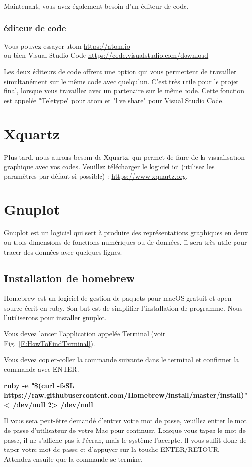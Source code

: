 \documentclass{article}
\newcommand\fig[1]{{Fig.~\ref{#1}}}
\begin{document}
Maintenant, vous avez également besoin d'un éditeur de code.
\subsubsection{éditeur de code}
Vous pouvez essayer atom \href{https://atom.io}{https://atom.io}\\
ou bien Visual Studio Code \href{https://code.visualstudio.com/download}{https://code.visualstudio.com/download}

Les deux éditeurs de code offrent une option qui vous permettent de travailler simultanément sur le même code avec quelqu'un. C'est très utile pour le projet final, lorsque vous travaillez avec un partenaire sur le même code. Cette fonction est appelée "Teletype" pour atom et "live share" pour Visual Studio Code. 

\section{Xquartz}
Plus tard, nous aurons besoin de Xquartz, qui permet de faire de la visualisation graphique avec vos codes.
Veuillez télécharger le logiciel ici (utilisez les paramètres par défaut si possible) : \href{https://www.xquartz.org}{https://www.xquartz.org}.
\section{Gnuplot}
Gnuplot est un logiciel qui sert à produire des représentations graphiques en deux ou trois dimensions de fonctions numériques ou de données. Il sera très utile pour tracer des données avec quelques lignes.
\subsection{Installation de homebrew}
Homebrew est un logiciel de gestion de paquets pour macOS gratuit et open-source écrit en ruby. Son but est de simplifier l'installation de programme. Nous l'utiliserons pour installer gnuplot.

Vous devez lancer l'application appelée Terminal (voir \fig{F:HowToFindTerminal}).

Vous devez copier-coller la commande suivante dans le terminal et confirmer la commande avec ENTER.
\begin{tcolorbox}[width=\textwidth,colframe=Bittersweet,colback={black},title={Ceci est le terminal},outer arc=0mm,colupper=white]    
      \large\textbf{ruby -e "\$(curl -fsSL https://raw.githubusercontent.com/Homebrew/install/master/install)" < /dev/null 2> /dev/null}
\end{tcolorbox}
Il vous sera peut-être demandé d'entrer votre mot de passe, veuillez entrer le mot de passe d'utilisateur de votre Mac pour continuer. Lorsque vous tapez le mot de passe, il ne s'affiche pas à l'écran, mais le système l'accepte. Il vous suffit donc de taper votre mot de passe et d'appuyer sur la touche ENTER/RETOUR. Attendez ensuite que la commande se termine.
\end{document}
